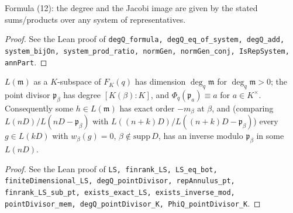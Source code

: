 \begin{proposition}[Formula (12)]
\label{prop:deg-q-formula}
\leanok
Formula (12): the degree and the Jacobi image are given by the stated sums/products over any system of representatives.
\end{proposition}
\begin{proof}
\leanok
See the Lean proof of \texttt{degQ\_formula, degQ\_eq\_of\_system, degQ\_add, system\_bijOn, system\_prod\_ratio, normGen, normGen\_conj, IsRepSystem, annPart}.
\end{proof}

\begin{proposition}
\label{prop:fq-places-LS}
\leanok
$L(\mathfrak m)$ as a $K$-subspace of $F_K(q)$ has dimension $\deg_q\mathfrak m$ for $\deg_q\mathfrak m>0$; the point divisor $\mathfrak p_\beta$ has degree $[K(\beta):K]$, and $\Phi_q(\mathfrak p_a)\equiv a$ for $a\in K^\times$. Consequently some $h\in L(\mathfrak m)$ has exact order $-m_\beta$ at $\beta$, and (comparing $L(nD)/L(nD-\mathfrak p_\beta)$ with $L((n+k)D)/L((n+k)D-\mathfrak p_\beta)$) every $g\in L(kD)$ with $w_\beta(g)=0$, $\beta\notin\mathrm{supp}\,D$, has an inverse modulo $\mathfrak p_\beta$ in some $L(nD)$.
\end{proposition}
\begin{proof}
\leanok
See the Lean proof of \texttt{LS, finrank\_LS, LS\_eq\_bot, finiteDimensional\_LS, degQ\_pointDivisor, repAnnulus\_pt, finrank\_LS\_sub\_pt, exists\_exact\_LS, exists\_inverse\_mod, pointDivisor\_mem, degQ\_pointDivisor\_K, PhiQ\_pointDivisor\_K}.
\end{proof}

